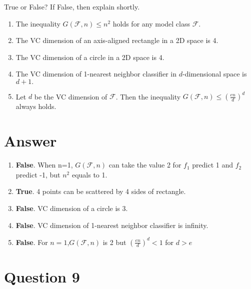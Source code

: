 \documentclass[
	12pt, %
]{fphw}
\begin{document}
\begin{problem}
True or False? If False, then explain shortly.
\medskip
\begin{enumerate}
\item The inequality $G(\mathcal{F},n)\leq n^2$ holds for any model class $\mathcal{F}.$
\item The VC dimension of an axis-aligned rectangle in a 2D space is 4.
\item The VC dimension of a circle in a 2D space is 4.
\item The VC dimension of 1-nearest neighbor classifier in $d$-dimensional space is $d+1.$
\item Let $d$ be the VC dimension of $\mathcal{F}$. Then the inequality $G(\mathcal{F},n)\leq\left(\frac{en}d\right)^d$ always holds.
\end{enumerate}
\end{problem}
\section*{Answer}
\begin{enumerate}
	\item \textbf{False}.  When n=1, $G(\mathcal{F},n)$ can take the value 2 for $f_1$ predict 1 and $f_2$ predict -1, but $n^2$ equals to 1.
	\item \textbf{True}. 4 points can be scattered by 4 sides of rectangle.
	\item \textbf{False}. VC dimension of a circle is 3.
	\item \textbf{False}. VC dimension of 1-nearest neighbor classifier is infinity.
	\item \textbf{False}. For $n=1$,$G(\mathcal{F},n)$ is 2 but $\left(\frac{en}d\right)^d<1$ for $d>e$
\end{enumerate}

\section*{Question 9}
\end{document}
